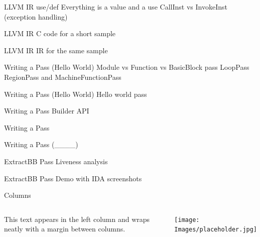 \documentclass{beamer}
\newcommand{\todo}[1]{\color{red}{TODO: #1}}
\begin{document}
\begin{frame}{LLVM IR}
    use/def
    Everything is a value and a use
    CallInst vs InvokeInst (exception handling)
\end{frame}

\begin{frame}{LLVM IR}
    C code for a short sample
\end{frame}

\begin{frame}{LLVM IR}
    IR for the same sample
\end{frame}


\begin{frame}{Writing a Pass (Hello World)}
    Module vs Function vs BasicBlock pass
    LoopPass RegionPass and MachineFunctionPass
\end{frame}

\begin{frame}{Writing a Pass (Hello World)}
    Hello world pass
\end{frame}

\begin{frame}{Writing a Pass}
    Builder API
\end{frame}

\begin{frame}{Writing a Pass}
    \todo{Any other interesting things?}
\end{frame}


\begin{frame}{Writing a Pass (\_\_\_\_)}
    \todo{Bogus arguments? Constant obfuscation? Detect vuln strcpy? Taint tracing?}
\end{frame}


\begin{frame}{ExtractBB Pass}
    Liveness analysis
\end{frame}

\begin{frame}{ExtractBB Pass}
    Demo with IDA screenshots
\end{frame}


\begin{frame}{Columns}
    \begin{columns}
            This text appears in the left column and wraps neatly with a margin between columns.

            \texttt{[image: Images/placeholder.jpg]}
    \end{columns}
\end{frame}
\end{document}
